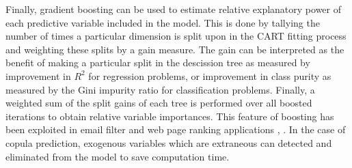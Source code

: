 Finally, gradient boosting can be used to estimate relative explanatory power of each predictive variable included in the model.  This is done by tallying the number of times a particular dimension is split upon in the CART fitting process and weighting these splits by a gain measure.  The gain can be interpreted as the benefit of making a particular split in the descission tree as measured by improvement in $R^2$ for regression problems, or improvement in class purity as measured by the Gini impurity ratio for classification problems.  Finally, a weighted sum of the split gains of each tree is performed over all boosted iterations to obtain relative variable importances.  This feature of boosting has been exploited in email filter and web page ranking applications \cite{chapelle2011}, \cite{Tyree2011}.  In the case of copula prediction, exogenous variables which are extraneous can detected and eliminated from the model to save computation time.
